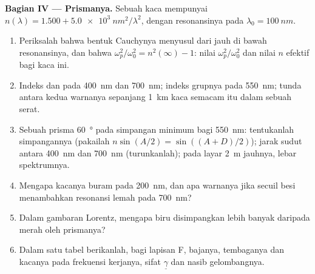 \begin{problem}
\medskip
\noindent\textbf{Bagian IV --- Prismanya.}
Sebuah kaca mempunyai $n(\lambda) = 1.500 + \qty{5.0e3}{nm^2}/\lambda^2$, dengan resonansinya
pada $\lambda_0 = \qty{100}{nm}$.
\begin{enumerate}[resume]
  \item Periksalah bahwa bentuk Cauchynya menyusul dari  jauh
        di bawah resonansinya, dan bahwa $\omega_p^2/\omega_0^2 = n^2(\infty) - 1$: nilai
        $\omega_p^2/\omega_0^2$ dan nilai $n$ efektif bagi kaca ini.
  \item Indeks dan  pada \qty{400}{nm} dan \qty{700}{nm}; indeks
        grupnya pada \qty{550}{nm}; tunda antara kedua warnanya sepanjang
        \qty{1}{km} kaca semacam itu dalam sebuah serat.
  \item Sebuah prisma \qty{60}{\degree} pada simpangan minimum bagi \qty{550}{nm}:
        tentukanlah simpangannya (pakailah $n\sin(A/2) = \sin((A + D)/2)$); jarak sudut
        antara \qty{400}{nm} dan \qty{700}{nm} (turunkanlah); pada layar
        \qty{2}{m} jauhnya, lebar spektrumnya.
  \item Mengapa kacanya buram pada \qty{200}{nm}, dan apa
        warnanya jika secuil besi menambahkan resonansi lemah pada \qty{700}{nm}?
  \item Dalam gambaran Lorentz, mengapa biru disimpangkan lebih banyak daripada merah oleh
        prismanya?
  \item Dalam satu tabel berikanlah, bagi lapisan F, bajanya, tembaganya dan
        kacanya pada frekuensi kerjanya, sifat
        $\underline\gamma$ dan nasib gelombangnya.
\end{enumerate}
\end{problem}
